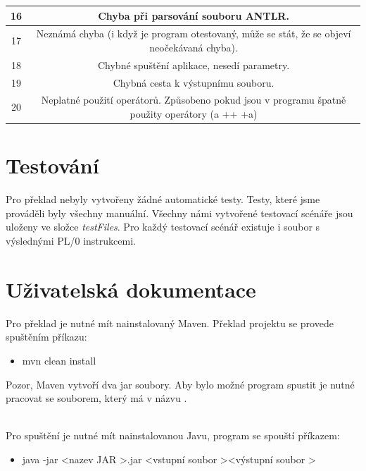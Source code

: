 \documentclass[12pt, a4paper]{article}
\begin{document}
\begin{table}[!h]
{\begin{tabular}{|c|c|}
16  & Chyba při parsování souboru ANTLR.                                                                 \\ \hline
17  & Neznámá chyba (i když je program otestovaný, může se stát, že se objeví neočekávaná chyba).										  									                                                                \\ \hline
18  & Chybné spuštění aplikace, nesedí parametry.                                                        \\ \hline
19  & Chybná cesta k výstupnímu souboru.                                                        \\ \hline
20  & Neplatné použití operátorů. Způsobeno pokud jsou v programu špatně použity operátory (a ++ +a)                                                     \\ \hline
\end{tabular}%
}
\end{table}
\newpage
\section{Testování}
\noindent Pro překlad nebyly vytvořeny žádné automatické testy. Testy, které jsme prováděli byly všechny manuální. Všechny námi vytvořené testovací scénáře jsou uloženy ve složce \textit{testFiles}. Pro každý testovací scénář existuje i soubor s výslednými \textsf{PL/0} instrukcemi.

\section{Uživatelská dokumentace}
\noindent Pro překlad je nutné mít nainstalovaný \textsf{Maven}. Překlad projektu se provede spuštěním příkazu:
\begin{itemize}
	\item mvn clean install
\end{itemize}

\noindent Pozor, \textsf{Maven} vytvoří dva jar soubory. Aby bylo možné program spustit je nutné pracovat se souborem, který má v názvu .

\mbox{}\\
\noindent Pro spuštění je nutné mít nainstalovanou \textsf{Javu}, program se spouští příkazem:

\begin{itemize}
	\item java -jar \textless nazev JAR \textgreater.jar \textless vstupní soubor \textgreater \textvisiblespace \textless výstupní soubor \textgreater
\end{itemize}
\end{document}
